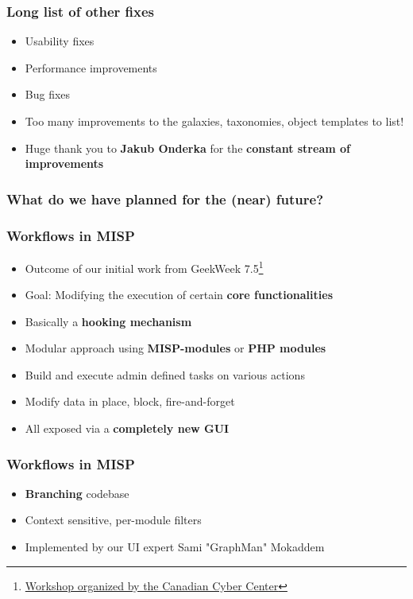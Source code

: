 \begin{frame}
  \frametitle{Long list of other fixes}
  \begin{itemize}
     \item Usability fixes
     \item Performance improvements
     \item Bug fixes
     \item Too many improvements to the galaxies, taxonomies, object templates to list!
     \item Huge thank you to {\bf Jakub Onderka} for the {\bf constant stream of improvements}
  \end{itemize}
\end{frame}

\begin{frame}
  \frametitle{What do we have planned for the (near) future?}
\end{frame}

\begin{frame}
  \frametitle{Workflows in MISP}
  \begin{itemize}
     \item Outcome of our initial work from GeekWeek 7.5\footnote{\href{https://cyber.gc.ca/en/events/geekweek-75}{Workshop organized by the Canadian Cyber Center}}
     \item Goal: Modifying the execution of certain {\bf core functionalities}
     \item Basically a {\bf hooking mechanism}
     \item Modular approach using {\bf MISP-modules} or {\bf PHP modules}
     \item Build and execute admin defined tasks on various actions
     \item Modify data in place, block, fire-and-forget
     \item All exposed via a {\bf completely new GUI}
  \end{itemize}
\end{frame}

\begin{frame}
  \frametitle{Workflows in MISP}
  \begin{itemize}
     \item {\bf Branching} codebase
     \item Context sensitive, per-module filters
     \item Implemented by our UI expert Sami "GraphMan" Mokaddem 
  \end{itemize}
\end{frame}


